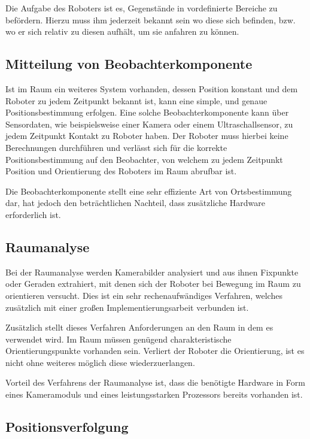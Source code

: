 Die Aufgabe des Roboters ist es, Gegenstände in vordefinierte Bereiche zu befördern. Hierzu muss ihm jederzeit bekannt sein wo diese sich befinden, bzw. wo er sich relativ zu diesen aufhält, um sie anfahren zu können.

\subsection{Mitteilung von Beobachterkomponente}
\label{subsec:Beobachter}

Ist im Raum ein weiteres System vorhanden, dessen Position konstant und dem Roboter zu jedem Zeitpunkt bekannt ist, kann eine simple, und genaue Positionsbestimmung erfolgen. Eine solche Beobachterkomponente kann über Sensordaten, wie beispielsweise einer Kamera oder einem Ultraschallsensor, zu jedem Zeitpunkt Kontakt zu Roboter haben.
Der Roboter muss hierbei keine Berechnungen durchführen und verlässt sich für die korrekte Positionsbestimmung auf den Beobachter, von welchem zu jedem Zeitpunkt Position und Orientierung des Roboters im Raum abrufbar ist.

Die Beobachterkomponente stellt eine sehr effiziente Art von Ortsbestimmung dar, hat jedoch den beträchtlichen Nachteil, dass zusätzliche Hardware erforderlich ist.

\subsection{Raumanalyse}

Bei der Raumanalyse werden Kamerabilder analysiert und aus ihnen Fixpunkte oder Geraden extrahiert, mit denen sich der Roboter bei Bewegung im Raum zu orientieren versucht. Dies ist ein sehr rechenaufwändiges Verfahren, welches zusätzlich mit einer großen Implementierungsarbeit verbunden ist.

Zusätzlich stellt dieses Verfahren Anforderungen an den Raum in dem es verwendet wird. Im Raum müssen genügend charakteristische Orientierungspunkte vorhanden sein. Verliert der Roboter die Orientierung, ist es nicht ohne weiteres möglich diese wiederzuerlangen.

Vorteil des Verfahrens der Raumanalyse ist, dass die benötigte Hardware in Form eines Kameramoduls und eines leistungsstarken Prozessors bereits vorhanden ist.

\subsection{Positionsverfolgung}

